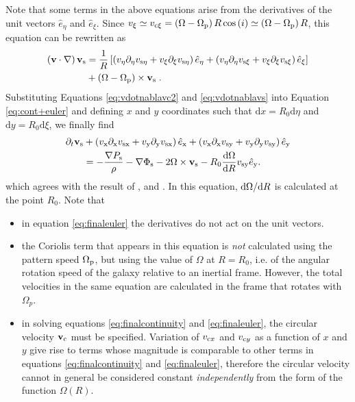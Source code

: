 \documentclass[useAMS,usenatbib]{mn2e}
\def\pa{\partial}
\begin{document}
%
Note that some terms in the above equations arise from the derivatives of the unit vectors $\hat{e}_\eta$ and $\hat{e}_\xi$. Since $v_\xi\simeq v_{\rm c\xi}=\left(\Omega-\Omega_{\rm p}\right)R\cos\left(i\right)\simeq\left(\Omega-\Omega_{\rm p}\right)R$, this equation can be rewritten as
\begin{align} 
\left( \bfv \cdot \nabla \right) \bfv_{\rm s} & = \frac{1}{R}\left[\left(v_\eta\pa_\eta v_{\rm s\eta}+v_\xi\pa_\xi v_{\rm s\eta}\right)\hat{e}_{\eta}+\left(v_\eta\pa_\eta v_{\rm s\xi}+v_\xi\pa_\xi v_{\rm s\xi}\right)\hat{e}_{\xi}\right]\nonumber \\
& + \left( \bfOmega - \bfOmegap \right) \times \bfv_{\rm s}\;. \label{eq:vdotnablavs}
\end{align}
%
Substituting Equations \eqref{eq:vdotnablavc2} and \eqref{eq:vdotnablavs} into Equation \eqref{eq:cont+euler} and defining $x$ and $y$ coordinates such that $\text{d}x=R_0\text{d}\eta$ and $\text{d}y=R_0\text{d}\xi$, we finally find
\begin{align}
\pa_t \bfv_{\rm s} &+  \left(v_{\rm x}\pa_{\rm x} v_{\rm sx}+v_{\rm y}\pa_{\rm y} v_{\rm sx}\right)\hat{e}_{\rm x}+\left(v_{\rm x}\pa_{\rm x} v_{\rm sy} +v_{\rm y}\pa_{\rm y} v_{\rm sy}\right)\hat{e}_{\rm y} \nonumber \\
& =- \frac{\nabla P_{\rm s}}{\rho} -\nabla \Phi_{\rm s} - 2 \bfOmega \times \bfv_{\rm s}-R_0 \frac{\di \Omega}{\di R} v_{\rm sy}  \hat{e}_{\rm y} . \label{eq:finaleuler}
\end{align}
which agrees with the result of \cite{Roberts1969}, \cite{Balbus1988} and \cite{KimKimKim2014}. In this equation, ${\mathrm{d} \Omega}/{\mathrm{d} R}$ is calculated at the point $R_0$. Note that
\begin{itemize} 
\item in equation \eqref{eq:finaleuler} the derivatives do not act on the unit vectors.
\item the Coriolis term that appears in this equation is \emph{not} calculated using the pattern speed $\Omega_{\rm p}$, but using the value of $\Omega$ at $R=R_0$, i.e. of the angular rotation speed of the galaxy relative to an inertial frame. However, the total velocities in the same equation are calculated in the frame that rotates with $\Omega_p$.
\item in solving equations \eqref{eq:finalcontinuity} and \eqref{eq:finaleuler}, the circular velocity $\mathbf{v}_{\rm c}$ must be specified. Variation of $v_{{\rm c}x}$ and $v_{{\rm c}y}$ as a function of $x$ and $y$ give rise to terms whose magnitude is comparable to other terms in equations \eqref{eq:finalcontinuity} and \eqref{eq:finaleuler}, therefore the circular velocity cannot in general be considered constant \emph{independently} from the form of the function $\Omega(R)$. 
\end{itemize}
\end{document}
